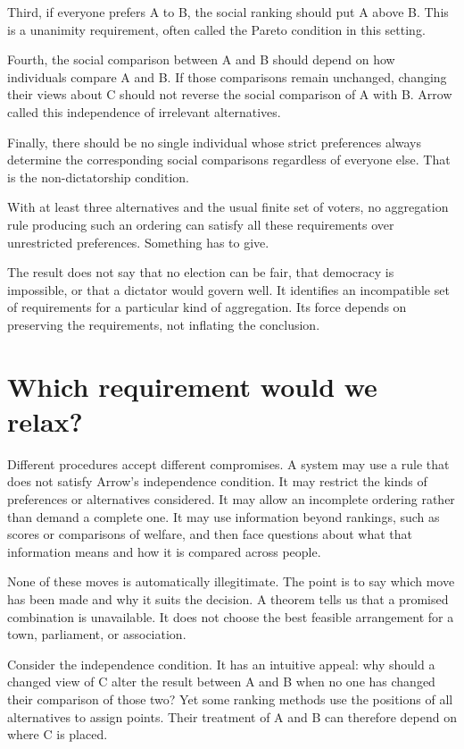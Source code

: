 \documentclass[12pt,a4paper]{book}
\begin{document}
Third, if everyone prefers A to B, the social ranking should put A above B. This is a unanimity requirement, often called the Pareto condition in this setting.

Fourth, the social comparison between A and B should depend on how individuals compare A and B. If those comparisons remain unchanged, changing their views about C should not reverse the social comparison of A with B. Arrow called this independence of irrelevant alternatives.

Finally, there should be no single individual whose strict preferences always determine the corresponding social comparisons regardless of everyone else. That is the non-dictatorship condition.

With at least three alternatives and the usual finite set of voters, no aggregation rule producing such an ordering can satisfy all these requirements over unrestricted preferences. Something has to give.

The result does not say that no election can be fair, that democracy is impossible, or that a dictator would govern well. It identifies an incompatible set of requirements for a particular kind of aggregation. Its force depends on preserving the requirements, not inflating the conclusion.

\section*{Which requirement would we relax?}

Different procedures accept different compromises. A system may use a rule that does not satisfy Arrow's independence condition. It may restrict the kinds of preferences or alternatives considered. It may allow an incomplete ordering rather than demand a complete one. It may use information beyond rankings, such as scores or comparisons of welfare, and then face questions about what that information means and how it is compared across people.

None of these moves is automatically illegitimate. The point is to say which move has been made and why it suits the decision. A theorem tells us that a promised combination is unavailable. It does not choose the best feasible arrangement for a town, parliament, or association.

Consider the independence condition. It has an intuitive appeal: why should a changed view of C alter the result between A and B when no one has changed their comparison of those two? Yet some ranking methods use the positions of all alternatives to assign points. Their treatment of A and B can therefore depend on where C is placed.
\end{document}
